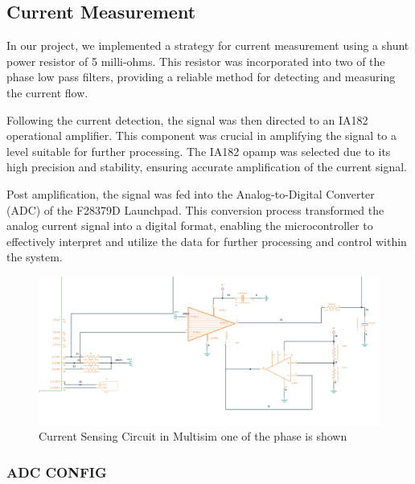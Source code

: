 \subsection{Current Measurement}

In our project, we implemented a strategy for current measurement using a shunt power resistor of 5 milli-ohms. This resistor was incorporated into two of the phase low pass filters, providing a reliable method for detecting and measuring the current flow.

Following the current detection, the signal was then directed to an IA182 operational amplifier. This component was crucial in amplifying the signal to a level suitable for further processing. The IA182 opamp was selected due to its high precision and stability, ensuring accurate amplification of the current signal.

Post amplification, the signal was fed into the Analog-to-Digital Converter (ADC) of the F28379D Launchpad. This conversion process transformed the analog current signal into a digital format, enabling the microcontroller to effectively interpret and utilize the data for further processing and control within the system. 



\begin{figure}[H]
	\centering
	\includegraphics[width=6in]{sections/section4/images/PCBDesign/Multisim/MultisimCurrentSensing.png}
	\caption{Current Sensing Circuit in Multisim one of the phase is shown}
\end{figure}


\subsubsection{ADC CONFIG}


\newpage